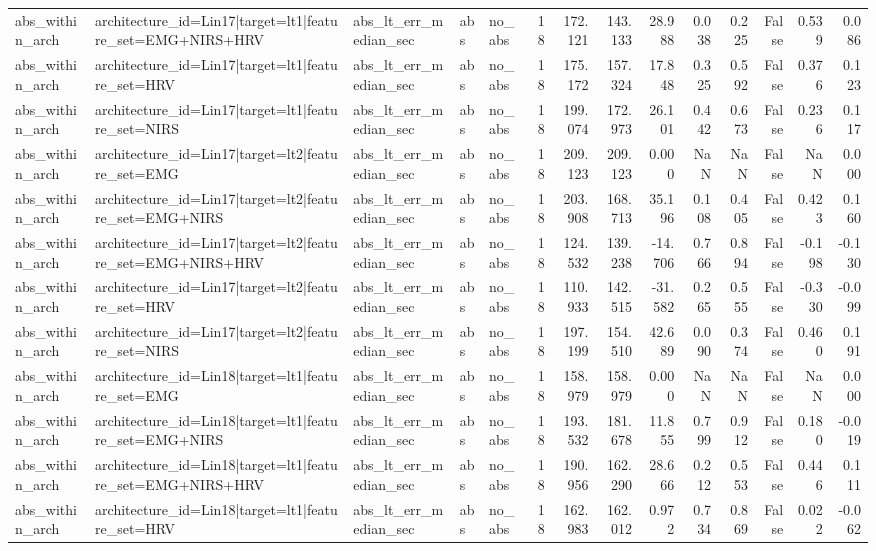 \begin{table}
\begin{tabular}{lllllrrrrrrrrr}
abs_within_arch & architecture_id=Lin17|target=lt1|feature_set=EMG+NIRS+HRV & abs_lt_err_median_sec & abs & no_abs & 18 & 172.121 & 143.133 & 28.988 & 0.038 & 0.225 & False & 0.539 & 0.086 \\
abs_within_arch & architecture_id=Lin17|target=lt1|feature_set=HRV & abs_lt_err_median_sec & abs & no_abs & 18 & 175.172 & 157.324 & 17.848 & 0.325 & 0.592 & False & 0.376 & 0.123 \\
abs_within_arch & architecture_id=Lin17|target=lt1|feature_set=NIRS & abs_lt_err_median_sec & abs & no_abs & 18 & 199.074 & 172.973 & 26.101 & 0.442 & 0.673 & False & 0.236 & 0.117 \\
abs_within_arch & architecture_id=Lin17|target=lt2|feature_set=EMG & abs_lt_err_median_sec & abs & no_abs & 18 & 209.123 & 209.123 & 0.000 & NaN & NaN & False & NaN & 0.000 \\
abs_within_arch & architecture_id=Lin17|target=lt2|feature_set=EMG+NIRS & abs_lt_err_median_sec & abs & no_abs & 18 & 203.908 & 168.713 & 35.196 & 0.108 & 0.405 & False & 0.423 & 0.160 \\
abs_within_arch & architecture_id=Lin17|target=lt2|feature_set=EMG+NIRS+HRV & abs_lt_err_median_sec & abs & no_abs & 18 & 124.532 & 139.238 & -14.706 & 0.766 & 0.894 & False & -0.198 & -0.130 \\
abs_within_arch & architecture_id=Lin17|target=lt2|feature_set=HRV & abs_lt_err_median_sec & abs & no_abs & 18 & 110.933 & 142.515 & -31.582 & 0.265 & 0.555 & False & -0.330 & -0.099 \\
abs_within_arch & architecture_id=Lin17|target=lt2|feature_set=NIRS & abs_lt_err_median_sec & abs & no_abs & 18 & 197.199 & 154.510 & 42.689 & 0.090 & 0.374 & False & 0.460 & 0.191 \\
abs_within_arch & architecture_id=Lin18|target=lt1|feature_set=EMG & abs_lt_err_median_sec & abs & no_abs & 18 & 158.979 & 158.979 & 0.000 & NaN & NaN & False & NaN & 0.000 \\
abs_within_arch & architecture_id=Lin18|target=lt1|feature_set=EMG+NIRS & abs_lt_err_median_sec & abs & no_abs & 18 & 193.532 & 181.678 & 11.855 & 0.799 & 0.912 & False & 0.180 & -0.019 \\
abs_within_arch & architecture_id=Lin18|target=lt1|feature_set=EMG+NIRS+HRV & abs_lt_err_median_sec & abs & no_abs & 18 & 190.956 & 162.290 & 28.666 & 0.212 & 0.553 & False & 0.446 & 0.111 \\
abs_within_arch & architecture_id=Lin18|target=lt1|feature_set=HRV & abs_lt_err_median_sec & abs & no_abs & 18 & 162.983 & 162.012 & 0.972 & 0.734 & 0.869 & False & 0.022 & -0.062 \\

\end{tabular}
\end{table}
